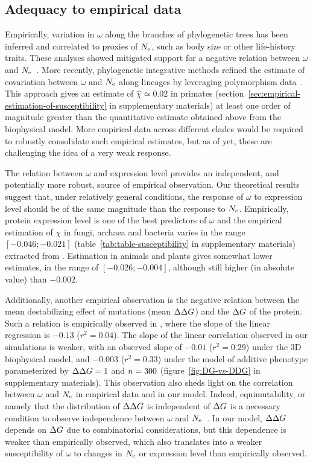 \subsection{Adequacy to empirical data}
Empirically, variation in $\omega$ along the branches of phylogenetic trees has been inferred and correlated to proxies of $N_{\text{e}}$, such as body size or other life-history traits.
These analyses showed mitigated support for a negative relation between $\omega$ and $N_{\text{e}}$~\citep{Lanfear2014}.
More recently, phylogenetic integrative methods refined the estimate of covariation between $\omega$ and $N_{\text{e}}$ along lineages by leveraging polymorphism data~\citep{Brevet2019}.
This approach gives an estimate of $\hat{\chi} \simeq 0.02$ in primates (section~\ref{sec:empirical-estimation-of-susceptibility} in supplementary materials) at least one order of magnitude greater than the quantitative estimate obtained above from the biophysical model.
More empirical data across different clades would be required to robustly consolidate such empirical estimates, but as of yet, these are challenging the idea of a very weak response.

The relation between $\omega$ and expression level provides an independent, and potentially more robust, source of empirical observation.
Our theoretical results suggest that, under relatively general conditions, the response of $\omega$ to expression level should be of the same magnitude than the response to $N_{\text{e}}$.
Empirically, protein expression level is one of the best predictors of $\omega$ and the empirical estimation of $\chi$ in fungi, archaea and bacteria varies in the range $[-0.046;-0.021]$ (table~\ref{tab:table-susceptibility} in supplementary materials) extracted from \citet{Zhang2015}.
Estimation in animals and plants gives somewhat lower estimates, in the range of $[-0.026;-0.004]$, although still higher (in absolute value) than $-0.002$.

Additionally, another empirical observation is the negative relation between the mean destabilizing effect of mutations (mean $\Delta \Delta G$) and the $\Delta G$ of the protein.
Such a relation is empirically observed in \citet{Serohijos2012}, where the slope of the linear regression is $-0.13$ ($r^2=0.04$).
The slope of the linear correlation observed in our simulations is weaker, with an observed slope of $-0.01$ ($r^2=0.29$) under the 3D biophysical model, and $-0.003$ ($r^2=0.33$) under the model of additive phenotype parameterized by $\Delta \Delta G = 1$ and $n=300$ (figure~\ref{fig:DG-vs-DDG} in supplementary materials).
This observation also sheds light on the correlation between $\omega$ and $N_{\text{e}}$ in empirical data and in our model.
Indeed, equimutability, or namely that the distribution of $\Delta \Delta G$ is independent of $\Delta G$ is a necessary condition to observe independence between $\omega$ and $N_{\text{e}}$~\citep{Cherry1998}.
In our model, $\Delta \Delta G$ depends on $\Delta G$ due to combinatorial considerations, but this dependence is weaker than empirically observed, which also translates into a weaker susceptibility of $\omega$ to changes in $N_{\text{e}}$ or expression level than empirically observed.

